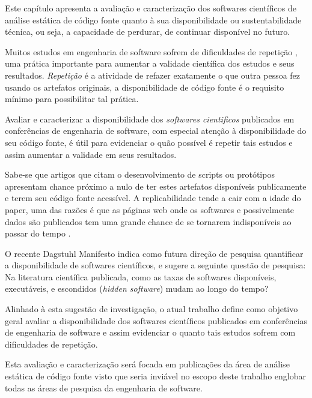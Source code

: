 {Este capítulo apresenta a avaliação e caracterização dos softwares científicos
de análise estática de código fonte quanto à sua disponibilidade ou
sustentabilidade técnica, ou seja, a capacidade de perdurar, de continuar
disponível no futuro.}
\label{caracterizacao-ferramentas}


Muitos estudos em engenharia de software sofrem de dificuldades de repetição
\cite{Tang2016}, uma prática importante para aumentar a validade científica dos
estudos e seus resultados. {\it Repetição} é a atividade de refazer exatamente
o que outra pessoa fez usando os artefatos originais, a disponibilidade de
código fonte é o requisito mínimo para possibilitar tal prática.

Avaliar e caracterizar a disponibilidade dos {\it softwares cientificos}
publicados em conferências de engenharia de software, com especial atenção à
disponibilidade do seu código fonte, é útil para evidenciar o quão possível é
repetir tais estudos e assim aumentar a validade em seus resultados.

Sabe-se que artigos que citam o desenvolvimento de scripts ou protótipos
apresentam chance próximo a nulo de ter estes artefatos disponíveis
publicamente e terem seu código fonte acessível. A replicabilidade tende a cair
com a idade do paper, uma das razões é que as páginas web onde os softwares e
possivelmente dados são publicados tem uma grande chance de se tornarem
indisponíveis ao passar do tempo \cite{robles2010replicating}.

O recente Dagstuhl Manifesto \cite{allen2017engineering} indica como futura
direção de pesquisa quantificar a disponibilidade de softwares científicos, e
sugere a seguinte questão de pesquisa: Na literatura científica publicada, como
as taxas de softwares disponíveis, executáveis, e escondidos ({\it hidden
software}) mudam ao longo do tempo?

Alinhado à esta sugestão de investigação, o atual trabalho define como objetivo
geral avaliar a disponibilidade dos softwares científicos publicados em
conferências de engenharia de software e assim evidenciar o quanto tais estudos
sofrem com dificuldades de repetição.

Esta avaliação e caracterização será focada em publicações da área de análise
estática de código fonte visto que seria inviável no escopo deste trabalho
englobar todas as áreas de pesquisa da engenharia de software.

